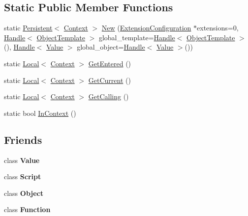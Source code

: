 \subsection*{Static Public Member Functions}
\begin{DoxyCompactItemize}
\item 
static \hyperlink{classv8_1_1_persistent}{Persistent}$<$ \hyperlink{classv8_1_1_context}{Context} $>$ \hyperlink{classv8_1_1_context_af4ea79b695e75849211ae26e28f8b517}{New} (\hyperlink{classv8_1_1_extension_configuration}{Extension\+Configuration} $\ast$extensions=0, \hyperlink{classv8_1_1_handle}{Handle}$<$ \hyperlink{classv8_1_1_object_template}{Object\+Template} $>$ global\+\_\+template=\hyperlink{classv8_1_1_handle}{Handle}$<$ \hyperlink{classv8_1_1_object_template}{Object\+Template} $>$(), \hyperlink{classv8_1_1_handle}{Handle}$<$ \hyperlink{classv8_1_1_value}{Value} $>$ global\+\_\+object=\hyperlink{classv8_1_1_handle}{Handle}$<$ \hyperlink{classv8_1_1_value}{Value} $>$())
\item 
static \hyperlink{classv8_1_1_local}{Local}$<$ \hyperlink{classv8_1_1_context}{Context} $>$ \hyperlink{classv8_1_1_context_accfc7365efba8bce18cbf9df1c1fc79d}{Get\+Entered} ()
\item 
static \hyperlink{classv8_1_1_local}{Local}$<$ \hyperlink{classv8_1_1_context}{Context} $>$ \hyperlink{classv8_1_1_context_aca2df9d70e51f241d733f4ad0eb46401}{Get\+Current} ()
\item 
static \hyperlink{classv8_1_1_local}{Local}$<$ \hyperlink{classv8_1_1_context}{Context} $>$ \hyperlink{classv8_1_1_context_ad795cbbb842307a57d656dd9690fadf2}{Get\+Calling} ()
\item 
static bool \hyperlink{classv8_1_1_context_a5cf983417f9cfc6e1dd9228eccb78d31}{In\+Context} ()
\end{DoxyCompactItemize}
\subsection*{Friends}
\begin{DoxyCompactItemize}
\item 
\hypertarget{classv8_1_1_context_aeceedf6e1a7d48a588516ce2b1983d6f}{}class {\bfseries Value}\label{classv8_1_1_context_aeceedf6e1a7d48a588516ce2b1983d6f}

\item 
\hypertarget{classv8_1_1_context_ae98eaa96d1b24e087f3c3e372fb09dce}{}class {\bfseries Script}\label{classv8_1_1_context_ae98eaa96d1b24e087f3c3e372fb09dce}

\item 
\hypertarget{classv8_1_1_context_a0720b5f434e636e22a3ed34f847eec57}{}class {\bfseries Object}\label{classv8_1_1_context_a0720b5f434e636e22a3ed34f847eec57}

\item 
\hypertarget{classv8_1_1_context_ab7194606aa12931e96f8f5448d418ed0}{}class {\bfseries Function}\label{classv8_1_1_context_ab7194606aa12931e96f8f5448d418ed0}

\end{DoxyCompactItemize}


